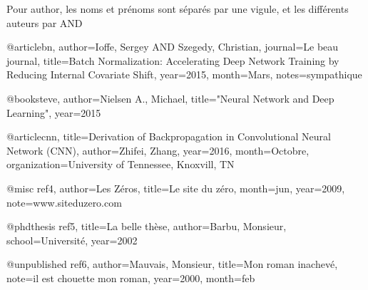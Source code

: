 Pour author, les noms et prénoms sont séparés par une vigule, et les différents auteurs par AND

@article{bn,
author={Ioffe, Sergey AND  Szegedy, Christian},
journal={Le beau journal},
title={Batch Normalization: Accelerating Deep Network Training by
Reducing Internal Covariate Shift},
year={2015},
month={Mars},
notes={sympathique}
}

@book{steve,
author={Nielsen A., Michael},
title={"Neural Network and Deep Learning"},
year={2015}
}

@article{cnn,
title={Derivation of Backpropagation in
Convolutional Neural Network (CNN)},
author={Zhifei, Zhang},
year={2016},
month={Octobre},
organization={University of Tennessee, Knoxvill, TN}
}

@misc
{ref4,
author={Les Zéros},
title={Le site du zéro},
month={jun},
year={2009},
note={www.siteduzero.com}
}

@phdthesis
{ref5,
title={La belle thèse},
author={Barbu, Monsieur},
school={Université},
year={2002}
}

@unpublished
{ref6,
author={Mauvais, Monsieur},
title={Mon roman inachevé},
note={il est chouette mon roman},
year={2000},
month={feb}
}
